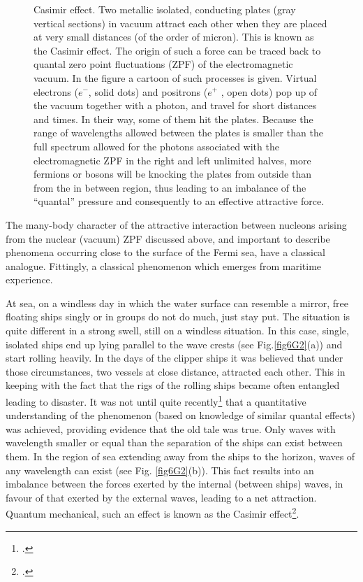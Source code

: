 \begin{subappendices}
\begin{figure}
\caption{Casimir effect. Two metallic isolated, conducting plates (gray vertical sections) in vacuum attract
each other when they are placed at very small distances (of the order of micron). This is known as the
Casimir effect. The origin of such a force can be traced back to quantal zero point fluctuations (ZPF) of the electromagnetic vacuum. In
the figure a cartoon of such processes is given. Virtual electrons ($e^-$, solid dots) and positrons ($e^+$ , open
dots) pop up of the vacuum together with a photon, and travel for short distances and times. In their
way, some of them hit the plates. Because the range of wavelengths allowed between
the plates is smaller than the full spectrum allowed for
the photons associated with the electromagnetic ZPF in the right and left unlimited halves, more fermions
or bosons will be knocking the plates from outside than from the in between region, thus leading to an imbalance of
the ``quantal'' pressure and consequently to an effective attractive force.}\label{fig6G3}
\end{figure}
The many-body character of the attractive interaction between nucleons arising from the nuclear (vacuum) ZPF discussed above, and important to describe phenomena occurring close to the surface of the Fermi sea, have a classical analogue. Fittingly, a classical phenomenon which emerges from maritime experience. 


At sea, on a windless day in which the water surface can resemble a mirror, free floating
ships singly or in groups do not do much, just stay put. The situation is quite different
in a strong swell, still on a windless situation. In this case, single, isolated ships end up
lying parallel to the wave crests (see Fig.\ref{fig6G2}(a)) and start rolling heavily. In the days
of the clipper ships it was believed that under those circumstances, two vessels at close
distance, attracted each other. This in keeping with the fact that the rigs of the rolling
ships became often entangled leading to disaster. It was not until quite recently\footnote{\cite{Boersma:96}.}
that a quantitative understanding of the phenomenon (based on knowledge of similar quantal
effects) was achieved, providing evidence that the old tale was true.
Only waves with wavelength smaller or equal than the separation of the ships can exist between
them. In the region of sea extending away from the ships to the horizon, waves of any
wavelength can exist (see Fig. \ref{fig6G2}(b)). This fact results into an imbalance between the
forces exerted by the internal (between ships) waves, in favour of that exerted by the
external waves, leading to a net attraction.
Quantum mechanical, such an effect is known as the Casimir effect\footnote{\cite{Casimir:48}.}. 



\end{subappendices}

